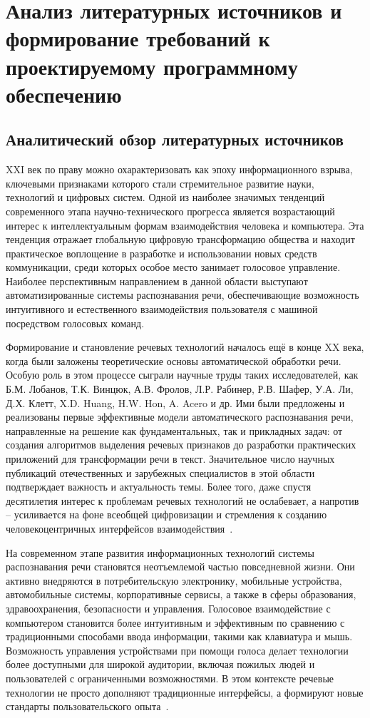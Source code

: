 \section{Анализ литературных источников и формирование требований к проектируемому программному обеспечению}

\subsection{Аналитический обзор литературных источников}

XXI век по праву можно охарактеризовать как эпоху информационного взрыва, ключевыми признаками которого стали стремительное развитие науки, технологий и цифровых систем. Одной из наиболее значимых тенденций современного этапа научно-технического прогресса является возрастающий интерес к интеллектуальным формам взаимодействия человека и компьютера. Эта тенденция отражает глобальную цифровую трансформацию общества и находит практическое воплощение в разработке и использовании новых средств коммуникации, среди которых особое место занимает голосовое управление. Наиболее перспективным направлением в данной области выступают автоматизированные системы распознавания речи, обеспечивающие возможность интуитивного и естественного взаимодействия пользователя с машиной посредством голосовых команд.

Формирование и становление речевых технологий началось ещё в конце XX века, когда были заложены теоретические основы автоматической обработки речи. Особую роль в этом процессе сыграли научные труды таких исследователей, как Б.М. Лобанов, Т.К. Винцюк, А.В. Фролов, Л.Р. Рабинер, Р.В. Шафер, У.А. Ли, Д.Х. Клетт, X.D. Huang, H.W. Hon, A. Acero и др. Ими были предложены и реализованы первые эффективные модели автоматического распознавания речи, направленные на решение как фундаментальных, так и прикладных задач: от создания алгоритмов выделения речевых признаков до разработки практических приложений для трансформации речи в текст. Значительное число научных публикаций отечественных и зарубежных специалистов в этой области подтверждает важность и актуальность темы. Более того, даже спустя десятилетия интерес к проблемам речевых технологий не ослабевает, а напротив -- усиливается на фоне всеобщей цифровизации и стремления к созданию человекоцентричных интерфейсов взаимодействия~\cite{LL1}.

На современном этапе развития информационных технологий системы распознавания речи становятся неотъемлемой частью повседневной жизни. Они активно внедряются в потребительскую электронику, мобильные устройства, автомобильные системы, корпоративные сервисы, а также в сферы образования, здравоохранения, безопасности и управления. Голосовое взаимодействие с компьютером становится более интуитивным и эффективным по сравнению с традиционными способами ввода информации, такими как клавиатура и мышь. Возможность управления устройствами при помощи голоса делает технологии более доступными для широкой аудитории, включая пожилых людей и пользователей с ограниченными возможностями. В этом контексте речевые технологии не просто дополняют традиционные интерфейсы, а формируют новые стандарты пользовательского опыта~\cite{LL2}.

